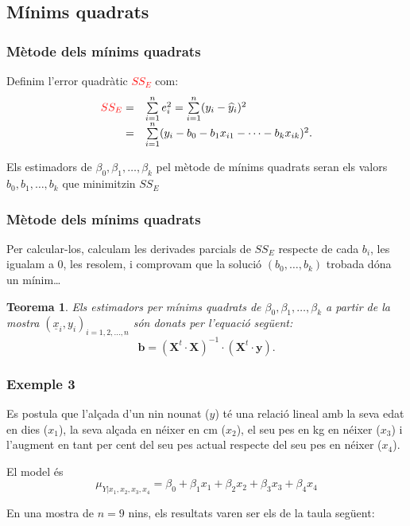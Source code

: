 \documentclass[12pt,t]{beamer}
\newcommand{\red}[1]{\textcolor{red}{#1}}
\renewcommand{\emph}[1]{{\color{red}#1}}
\theoremstyle{plain}
\newtheorem{teorema}{Teorema}
\theoremstyle{definition}
\begin{document}
\subsection{Mínims quadrats}
\begin{frame}
\frametitle{Mètode dels mínims quadrats}

Definim l'\emph{error quadràtic} \red{$SS_E$} com:
$$
\begin{array}{rl}
\red{SS_E}=&\sum\limits_{i=1}^n
e^2_i=\sum\limits_{i=1}^n (y_i-\widehat{y}_i)^2 \\
=&\sum\limits_{i=1}^n (y_i-b_0-b_1 x_{i 1}-\cdots -b_{k} x_{ik})^2.
\end{array}
$$

Els estimadors de $\beta_0,\beta_1,\ldots, \beta_k$ pel mètode de mínims quadrats seran els
valors $b_0,b_1,\ldots, b_k$ que minimitzin $SS_E$
\end{frame}

\begin{frame}
\frametitle{Mètode dels mínims quadrats}

Per calcular-los, calculam les derivades parcials de $SS_E$ respecte de cada $b_i$, les igualam a 0, les resolem, i comprovam que la solució $(b_0,\ldots,b_k)$ trobada dóna un mínim\ldots
\medskip

\begin{teorema}
Els estimadors per mínims quadrats de $\beta_0,\beta_1,\ldots,\beta_k$ a partir de la mostra 
$(\underline{x}_{i},y_i)_{i=1,2,\ldots,n}$ són donats per l'equació següent:
$$
\mathbf{b}=\left(\mathbf{X}^t\cdot \mathbf{X}
\right)^{-1}\cdot \left(\mathbf{X}^t \cdot \mathbf{y}\right).
$$
\end{teorema}
\end{frame}

\begin{frame}
\frametitle{Exemple 3}

Es postula que l'alçada d'un nin nounat ($y$) té
una relació  lineal amb la seva edat en dies ($x_1$), la seva alçada en néixer en
cm ($x_2$), el seu pes en kg en néixer ($x_3$) i l'augment en tant per cent del seu pes actual respecte del seu pes en néixer ($x_4$). 
\medskip

El model és
$$
\mu_{Y|x_1,x_2,x_3,x_4}=\beta_0+\beta_1x_1+\beta_2x_2+\beta_3x_3+\beta_4x_4
$$
\medskip

En una mostra de $n=9$
nins, els resultats varen ser els de la taula següent:
\end{frame}
\end{document}
